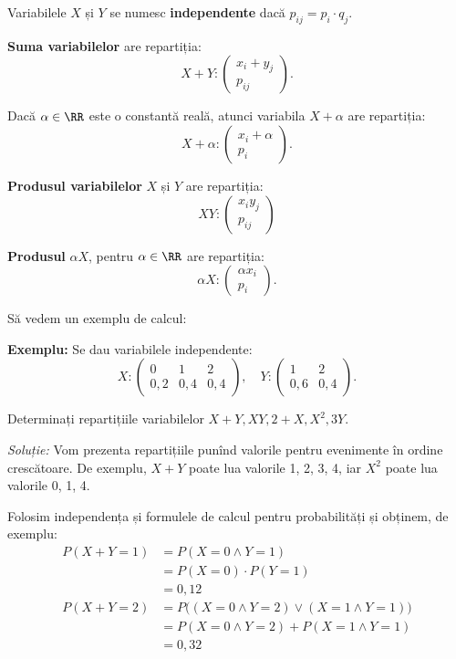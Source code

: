 Variabilele $ X $ și $ Y $ se numesc \textbf{independente} dacă $ p_{ij} = p_i \cdot q_j $.

\textbf{Suma variabilelor} are repartiția:
\[
  X + Y : \begin{pmatrix} x_i + y_j \\ p_{ij} \end{pmatrix}.
\]

Dacă $ \alpha \in \RR $ este o constantă reală, atunci variabila $ X + \alpha $ are repartiția:
\[
  X + \alpha : \begin{pmatrix} x_i + \alpha \\ p_i \end{pmatrix}.
\]

\textbf{Produsul variabilelor} $ X $ și $ Y $ are repartiția:
\[
  XY : \begin{pmatrix} x_iy_j \\ p_{ij} \end{pmatrix}
\]

\textbf{Produsul} $ \alpha X $, pentru $ \alpha \in \RR $ are repartiția:
\[
  \alpha X : \begin{pmatrix} \alpha x_i \\ p_i \end{pmatrix}.
\]

\vspace{0.3cm}

Să vedem un exemplu de calcul:

\textbf{Exemplu:} Se dau variabilele independente:
\[
  X : %
  \begin{pmatrix}
    0 & 1 & 2 \\
    0,2 & 0,4 & 0,4
  \end{pmatrix}, \quad %
  Y : %
  \begin{pmatrix}
    1 & 2 \\
    0,6 & 0,4
  \end{pmatrix}.
\]

Determinați repartițiile variabilelor $ X + Y, XY, 2 + X, X^2, 3Y $.

\emph{Soluție:} Vom prezenta repartițiile punînd valorile pentru evenimente
în ordine crescătoare. De exemplu, $ X + Y $ poate lua valorile 1, 2, 3, 4,
iar $ X^2 $ poate lua valorile 0, 1, 4.

Folosim independența și formulele de calcul pentru probabilități și obținem,
de exemplu:
\begin{align*}
  P(X + Y = 1) &= P(X = 0 \land Y = 1) \\
               &= P(X = 0) \cdot P(Y = 1) \\
               &= 0,12 \\
  P(X + Y = 2) &= P\Big((X = 0 \land Y = 2) \lor (X = 1 \land Y = 1)\Big) \\
               &= P(X = 0 \land Y = 2) + P(X = 1 \land Y = 1) \\
               &= 0,32
\end{align*}

